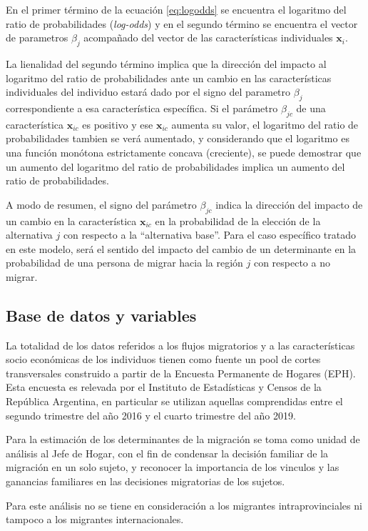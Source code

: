 \documentclass[12pt,a4paper]{article}
\begin{document}
En el primer término de la ecuación \ref{eq:logodds} se encuentra el logaritmo del ratio de probabilidades (\textit{log-odds}) y en el segundo término se encuentra el vector de parametros $\beta_{j}$ acompañado del vector de las características individuales $\textbf{x}_{i}$. 

La lienalidad del segundo término implica que la dirección del impacto al logaritmo del ratio de probabilidades ante  un cambio en las características individuales del individuo estará dado por el signo del parametro $\beta_{j}$ correspondiente a esa característica específica. Si el parámetro  $\beta_{jc}$ de una característica $\textbf{x}_{ic}$ es positivo y ese $\textbf{x}_{ic}$  aumenta su valor, el logaritmo del ratio de probabilidades tambien se verá aumentado, y considerando que el logaritmo es una función monótona estrictamente concava (creciente), se puede demostrar que un aumento del logaritmo del ratio de probabilidades implica un aumento del ratio de probabilidades.

A modo de resumen, el signo del parámetro $\beta_{jc}$ indica la dirección del impacto de un cambio en la característica $\textbf{x}_{ic}$ en la probabilidad de la elección de la alternativa $j$ con respecto a la ``alternativa base''. Para el caso específico tratado en este modelo, será el sentido del impacto del cambio de un determinante en la probabilidad de una persona de migrar hacia la región $j$ con respecto a no migrar.

\subsection{Base de datos y variables}
La totalidad de los datos referidos a los flujos migratorios y a las características socio económicas de los individuos tienen como fuente un pool de cortes transversales  construido a partir de la Encuesta Permanente de Hogares (EPH). Esta encuesta es relevada por el Instituto de Estadísticas y Censos de la República Argentina, en particular se utilizan aquellas comprendidas entre el segundo trimestre del año 2016 y el cuarto trimestre del año 2019.

Para la estimación de los determinantes de la migración se toma como unidad de análisis al Jefe de Hogar, con el fin de condensar la decisión familiar de la migración en un solo sujeto, y reconocer la importancia de los vinculos y las ganancias familiares en las decisiones migratorias de los sujetos.

Para este análisis no se tiene en consideración a los migrantes intraprovinciales ni tampoco a los migrantes internacionales.
\end{document}
